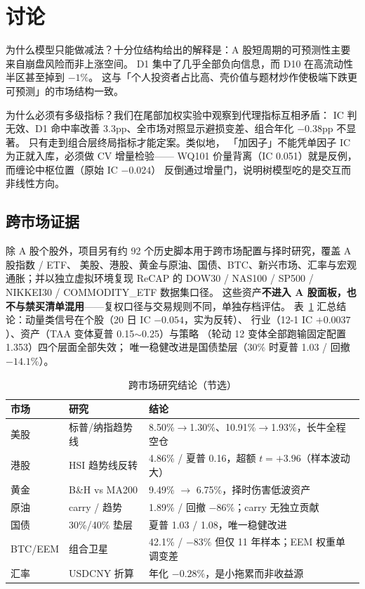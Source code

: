 \documentclass[sigconf]{acmart}
\begin{document}
\section{讨论}

为什么模型只能做减法？十分位结构给出的解释是：A 股短周期的可预测性主要来自崩盘风险而非上涨空间。
D1 集中了几乎全部负向信息，而 D10 在高流动性半区甚至掉到 $-1\%$。
这与「个人投资者占比高、壳价值与题材炒作使极端下跌更可预测」的市场结构一致。

为什么必须有多级指标？我们在尾部加权实验中观察到代理指标互相矛盾：
IC 判无效、D1 命中率改善 3.3pp、全市场对照显示避损变差、组合年化 $-0.38$pp 不显著。
只有走到组合层终局指标才能定案。类似地，
「加因子」不能凭单因子 IC 为正就入库，必须做 CV 增量检验——
WQ101 价量背离（IC 0.051）就是反例，而缠论中枢位置（原始 IC $-0.024$）
反倒通过增量门，说明树模型吃的是交互而非线性方向。

\subsection{跨市场证据}

除 A 股个股外，项目另有约 92 个历史脚本用于跨市场配置与择时研究，覆盖 A 股指数 / ETF、
美股、港股、黄金与原油、国债、BTC、新兴市场、汇率与宏观通胀；并以独立虚拟环境复现
ReCAP 的 DOW30 / NAS100 / SP500 / NIKKEI30 / COMMODITY\_ETF 数据集口径。
这些资产\textbf{不进入 A 股面板，也不与禁买清单混用}——复权口径与交易规则不同，单独存档评估。
表~\ref{tab:markets} 汇总结论：动量类信号在个股（20 日 IC $-0.054$，实为反转）、
行业（12-1 IC $+0.0037$）、资产（TAA 变体夏普 0.15$\sim$0.25）与策略
（轮动 12 变体全部跑输固定配置 1.353）四个层面全部失效；
唯一稳健改进是国债垫层（30\% 时夏普 1.03 / 回撤 $-14.1\%$）。

\begin{table}[t]
\caption{跨市场研究结论（节选）}
\label{tab:markets}
\small
\begin{tabular}{p{1.3cm}p{2.5cm}p{3.2cm}}
\toprule
市场 & 研究 & 结论 \\
\midrule
美股 & 标普/纳指趋势线 & 8.50\%$\to$1.30\%、10.91\%$\to$1.93\%，长牛全程空仓 \\
港股 & HSI 趋势线反转 & 4.86\% / 夏普 0.16，超额 $t=+3.96$（样本波动大） \\
黄金 & B\&H vs MA200 & 9.49\% $\to$ 6.75\%，择时伤害低波资产 \\
原油 & carry / 趋势 & 1.89\% / 回撤 $-86\%$；carry 无独立贡献 \\
国债 & 30\%/40\% 垫层 & 夏普 1.03 / 1.08，唯一稳健改进 \\
BTC/EEM & 组合卫星 & 42.1\% / $-83\%$ 但仅 11 年样本；EEM 权重单调变差 \\
汇率 & USDCNY 折算 & 年化 $-0.28\%$，是小拖累而非收益源 \\
\bottomrule
\end{tabular}
\end{table}
\end{document}
